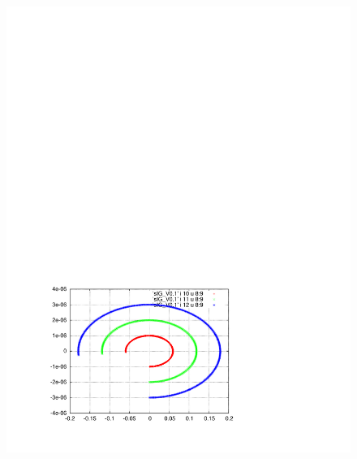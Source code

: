 \documentclass[]{article}
\begin{document}
\begin{figure}[h]
\begin{minipage}[b]{0.45\linewidth}
\includegraphics[scale=0.6]{pdf/delta_vs_ct_V0p1.pdf}
\end{minipage}
%
%
\begin{minipage}[b]{0.45\linewidth}
\centering

\end{minipage}
\end{figure}
\end{document}
